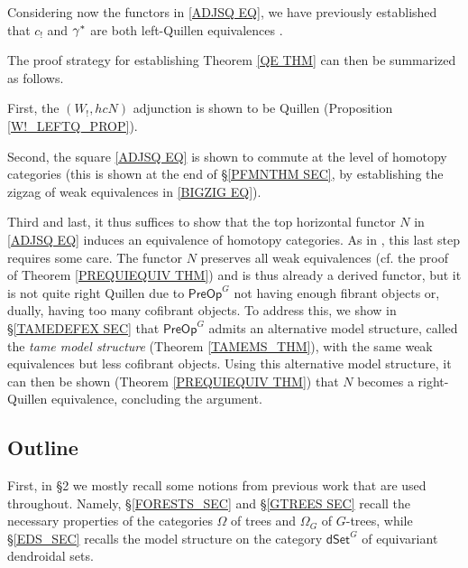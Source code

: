 \documentclass[a4paper,10pt
,draft
]{article}%
\numberwithin{equation}{section}
\numberwithin{figure}{section}
\theoremstyle{definition} %
\newcommand{\1}{\ensuremath{\mathbbm 1}}%
\begin{document}
Considering now the functors in 
\eqref{ADJSQ EQ},
we have previously established that 
$c_!$ and $\gamma^{\**}$
are both left-Quillen equivalences
\cite[Thms. 4.30 and 4.41]{BP_edss}.

The proof strategy for establishing 
Theorem \ref{QE THM}
can then be summarized as follows.

First, the $(W_!,hcN)$ adjunction
is shown to be Quillen (Proposition \ref{W!_LEFTQ_PROP}).

Second, the square 
\eqref{ADJSQ EQ}
is shown to commute at the level of homotopy categories 
(this is 
shown at the end of 
\S \ref{PFMNTHM SEC}, 
by establishing the zigzag of weak equivalences in 
\eqref{BIGZIG EQ}).

Third and last, it thus suffices to show that the top horizontal 
functor $N$ in \eqref{ADJSQ EQ}
induces an equivalence of homotopy categories.
As in \cite{CM13b},
this last step requires some care.
The functor $N$ preserves all weak equivalences
(cf. the proof of Theorem \ref{PREQUIEQUIV THM})
and is thus already a derived functor,
but it is not quite right Quillen 
due to $\mathsf{PreOp}^G$ not having enough fibrant objects 
or, dually, having too many cofibrant objects.
To address this, we show in \S \ref{TAMEDEFEX SEC}
that $\mathsf{PreOp}^G$
admits an alternative model structure, 
called the \emph{tame model structure} 
(Theorem \ref{TAMEMS_THM}),
with the same weak equivalences but
less cofibrant objects.
Using this alternative model structure,
it can then be shown 
(Theorem \ref{PREQUIEQUIV THM})
that $N$ becomes a right-Quillen equivalence,
concluding the argument.






\subsection{Outline}


First, in \S 2 we mostly recall 
some notions from previous work that are used throughout.
Namely, 
\S \ref{FORESTS_SEC} and \S \ref{GTREES SEC}
recall the necessary properties of the categories 
$\Omega$ of trees and $\Omega_G$ of $G$-trees,
while \S \ref{EDS_SEC}
recalls the model structure on the category 
$\mathsf{dSet}^G$
of equivariant dendroidal sets.
\end{document}

